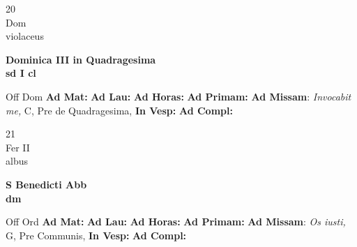 \documentclass[10pt, openany]{book}
\begin{document}
    \begin{center}
        \begin{minipage}{3.5in}
            \vspace{2em}
            \begin{minipage}{0.5in}
                {\Huge 20} \\
                {\normalsize Dom} \\
                {\normalsize violaceus}
            \end{minipage}
            \begin{minipage}{3.0in}
                \textbf{ \large Dominica III in Quadragesima \\
                \textnormal{\normalsize sd I cl}} \\ 
            \end{minipage}
            \begin{justify}Off Dom
                \textbf{Ad Mat: }
                \textbf{Ad Lau: }
                \textbf{Ad Horas: }
                \textbf{Ad Primam: }\textbf{Ad Missam}: \textit{Invocabit me,} C, Pre de Quadragesima,  
                \textbf{In Vesp: }
                \textbf{Ad Compl: }
            \end{justify}
        \end{minipage}
    \end{center}

    \begin{center}
        \begin{minipage}{3.5in}
            \vspace{2em}
            \begin{minipage}{0.5in}
                {\Huge 21} \\
                {\normalsize Fer II} \\
                {\normalsize albus}
            \end{minipage}
            \begin{minipage}{3.0in}
                \textbf{ \large S Benedicti Abb \\
                \textnormal{\normalsize dm}} \\ 
            \end{minipage}
            \begin{justify}Off Ord
                \textbf{Ad Mat: }
                \textbf{Ad Lau: }
                \textbf{Ad Horas: }
                \textbf{Ad Primam: }\textbf{Ad Missam}: \textit{Os iusti,} G, Pre Communis,  
                \textbf{In Vesp: }
                \textbf{Ad Compl: }
            \end{justify}
        \end{minipage}
    \end{center}
\end{document}
